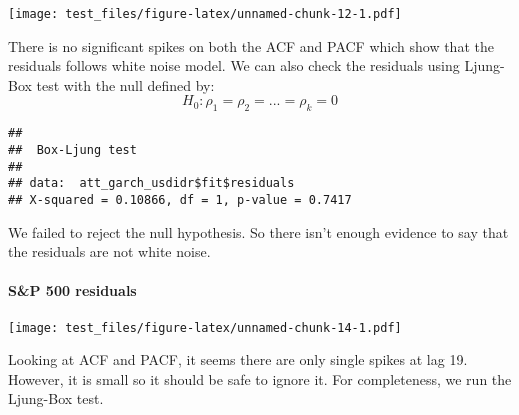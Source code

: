 \documentclass[]{article}
\newenvironment{Shaded}{\begin{snugshade}}{\end{snugshade}}
\newcommand{\KeywordTok}[1]{\textcolor[rgb]{0.13,0.29,0.53}{\textbf{#1}}}
\newcommand{\DataTypeTok}[1]{\textcolor[rgb]{0.13,0.29,0.53}{#1}}
\newcommand{\StringTok}[1]{\textcolor[rgb]{0.31,0.60,0.02}{#1}}
\newcommand{\OperatorTok}[1]{\textcolor[rgb]{0.81,0.36,0.00}{\textbf{#1}}}
\newcommand{\NormalTok}[1]{#1}
\let\oldparagraph\paragraph
\renewcommand{\paragraph}[1]{\oldparagraph{#1}\mbox{}}
\begin{document}
\begin{Shaded}
\end{Shaded}

\texttt{[image: test\_files/figure-latex/unnamed-chunk-12-1.pdf]}

There is no significant spikes on both the ACF and PACF which show that
the residuals follows white noise model. We can also check the residuals
using Ljung-Box test with the null defined by:
\[H_{0}:\rho_{1}=\rho_{2}=...=\rho_{k}=0\]

\begin{Shaded}
\end{Shaded}

\begin{verbatim}
## 
##  Box-Ljung test
## 
## data:  att_garch_usdidr$fit$residuals
## X-squared = 0.10866, df = 1, p-value = 0.7417
\end{verbatim}

We failed to reject the null hypothesis. So there isn't enough evidence
to say that the residuals are not white noise.

\paragraph{S\&P 500 residuals}\label{sp-500-residuals}

\begin{Shaded}
\end{Shaded}

\texttt{[image: test\_files/figure-latex/unnamed-chunk-14-1.pdf]}

Looking at ACF and PACF, it seems there are only single spikes at lag
19. However, it is small so it should be safe to ignore it. For
completeness, we run the Ljung-Box test.
\end{document}
